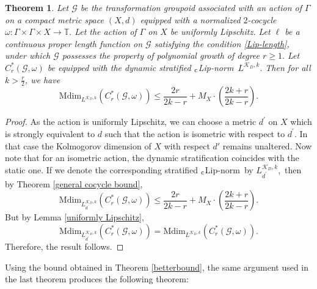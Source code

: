 \documentclass[a4paper,11pt,reqno]{amsart}
\theoremstyle{plain}
\newtheorem{thm}{Theorem}[section]
\theoremstyle{mainthmstyle}
\theoremstyle{named}
\numberwithin{equation}{section}
\newcommand{\clipnorm}{$_{\text{\rm c}}$Lip-norm}
\begin{document}
\begin{thm}\label{dynamic_finite_bound}
Let $\mathcal{G}$ be the transformation groupoid associated with an action of $\Gamma$ on a compact metric space $(X, d)$ equipped with a normalized $2$-cocycle $\omega : \Gamma \times \Gamma \times X \rightarrow \mathbb T.$ Let the action of $\Gamma$ on $X$ be uniformly Lipschitz. Let $\ell$ be a continuous proper length function on $\mathcal G$ satisfying the condition \eqref{Lip-length}, under which $\mathcal G$ possesses the property of polynomial growth of degree $r \geq 1.$ Let $C_r^{\ast}(\mathcal {G}, \omega)$ be equipped with the dynamic stratified \clipnorm\ $L^{\mathcal{K}_{D}, k}.$ Then for all $k > \frac{r}{2}$, we have
\begin{displaymath}\mathrm{Mdim}_{L^{\mathcal{K}_{D},k}} (C_r^{\ast}(\mathcal{G}, \omega)) \leq \frac {2 r} {2 k - r} + M_X \cdot \left (\frac {2 k + r} {2 k - r} \right ).\end{displaymath}
\end{thm}
\begin{proof}
    As the action is uniformly Lipschitz, we can choose a metric $d^{\prime}$ on $X$ which is strongly equivalent to $d$ such that the action is isometric with respect to $d^{\prime}$. In that case the Kolmogorov dimension of $X$ with respect $d'$ remains unaltered. Now note that for an isometric action, the dynamic stratification coincides with the static one. If we denote the corresponding stratified \clipnorm\ by $L^{\mathcal{K}_{D},k}_{d^{\prime}},$ then by Theorem \ref{general cocycle bound}, 
    \begin{displaymath}
     \mathrm{Mdim}_{L^{\mathcal{K}_{D},k}_{d^{\prime}}} (C_r^{\ast}(\mathcal{G}, \omega)) \leq \frac {2 r} {2 k - r} + M_X \cdot \left (\frac {2 k + r} {2 k - r} \right ).   
    \end{displaymath}
    But by Lemma \ref{uniformly Lipschitz}, 
    \begin{displaymath}
        \mathrm{Mdim}_{L^{\mathcal{K}_{D},k}_{d^{\prime}}} (C_r^{\ast}(\mathcal{G}, \omega))=\mathrm{Mdim}_{L^{\mathcal{K}_{D},k}} (C_r^{\ast}(\mathcal{G}, \omega)).
    \end{displaymath}
    Therefore, the result follows.
\end{proof}
Using the bound obtained in Theorem \ref{betterbound}, the same argument used in the last theorem produces the following theorem: 
\end{document}
